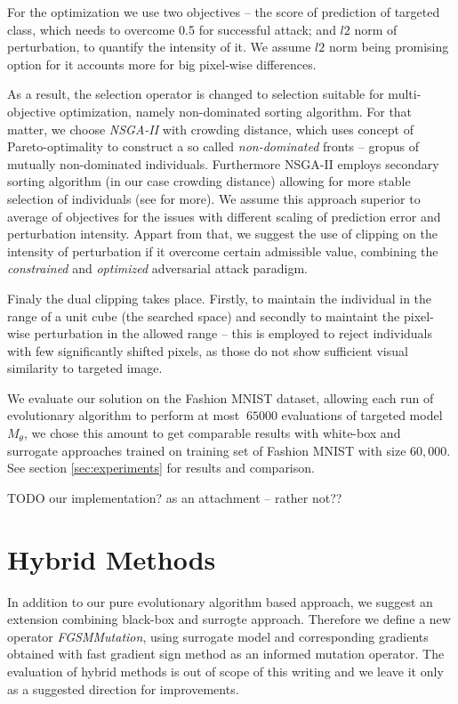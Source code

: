 For the optimization we use two objectives -- the score of prediction of targeted class, which needs to overcome 0.5 for successful attack; and $l2$ norm of perturbation, to quantify the intensity of it. We assume $l2$ norm being promising option for it accounts more for big pixel-wise differences.

As a result, the selection operator is changed to selection suitable for multi-objective optimization, namely non-dominated sorting algorithm. For that matter, we choose \emph{NSGA-II} with crowding distance, which uses concept of Pareto-optimality to construct a so called \emph{non-dominated} fronts -- gropus of mutually non-dominated individuals. Furthermore NSGA-II employs secondary sorting algorithm (in our case crowding distance) allowing for more stable selection of individuals (see \cite{nsga} for more). We assume this approach superior to average of objectives for the issues with different scaling of prediction error and perturbation intensity. Appart from that, we suggest the use of clipping on the intensity of perturbation if it overcome certain admissible value, combining the \emph{constrained} and \emph{optimized} adversarial attack paradigm.

Finaly the dual clipping takes place. Firstly, to maintain the individual in the range of a unit cube (the searched space) and secondly to maintaint the pixel-wise perturbation in the allowed range -- this is employed to reject individuals with few significantly shifted pixels, as those do not show sufficient visual similarity to targeted image.

We evaluate our solution on the Fashion MNIST dataset, allowing each run of evolutionary algorithm to perform at most $~65000$ evaluations of targeted model $M_\theta$, we chose this amount to get comparable results with white-box and surrogate approaches trained on training set of Fashion MNIST with size $60,000$. See section \ref{sec:experiments} for results and comparison.

TODO our implementation? as an attachment -- rather not??

\section{Hybrid Methods}
In addition to our pure evolutionary algorithm based approach, we suggest an extension combining black-box and surrogte approach. Therefore we define a new operator \emph{FGSMMutation}, using surrogate model and corresponding gradients obtained with fast gradient sign method as an informed mutation operator. The evaluation of hybrid methods is out of scope of this writing and we leave it only as a suggested direction for improvements.

